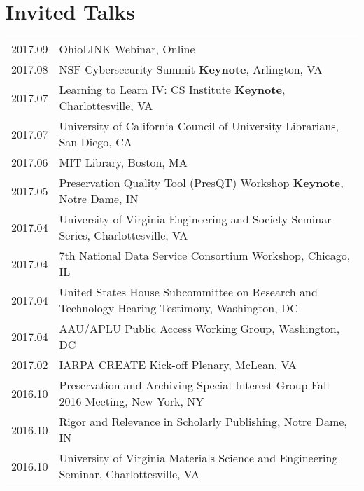 \documentclass[11pt]{article}
\begin{document}
\section*{Invited Talks}
\begin{tabularx}{\textwidth}{lX}
    2017.09     & OhioLINK Webinar, Online \\ %
    2017.08     & NSF Cybersecurity Summit \textbf{Keynote}, Arlington, VA \\ %
    2017.07     & Learning to Learn IV: CS Institute \textbf{Keynote}, Charlottesville, VA \\ %
    2017.07     & University of California Council of University Librarians, San Diego, CA \\
    2017.06     & MIT Library, Boston, MA \\
    2017.05     & Preservation Quality Tool (PresQT) Workshop \textbf{Keynote}, Notre Dame, IN\\%
    2017.04     & University of Virginia Engineering and Society Seminar Series, Charlottesville, VA\\
    2017.04     & 7th National Data Service Consortium Workshop, Chicago, IL\\ %
    2017.04     & United States House Subcommittee on Research and Technology Hearing Testimony, Washington, DC\\ %
    2017.04     & AAU/APLU Public Access Working Group, Washington, DC \\
    2017.02     & IARPA CREATE Kick-off Plenary, McLean, VA\\
    2016.10     & Preservation and Archiving Special Interest Group Fall 2016 Meeting, New York, NY\\ %
    2016.10     & Rigor and Relevance in Scholarly Publishing, Notre Dame, IN\\ %
    2016.10     & University of Virginia Materials Science and Engineering Seminar, Charlottesville, VA\\ %

\end{tabularx}
\end{document}
